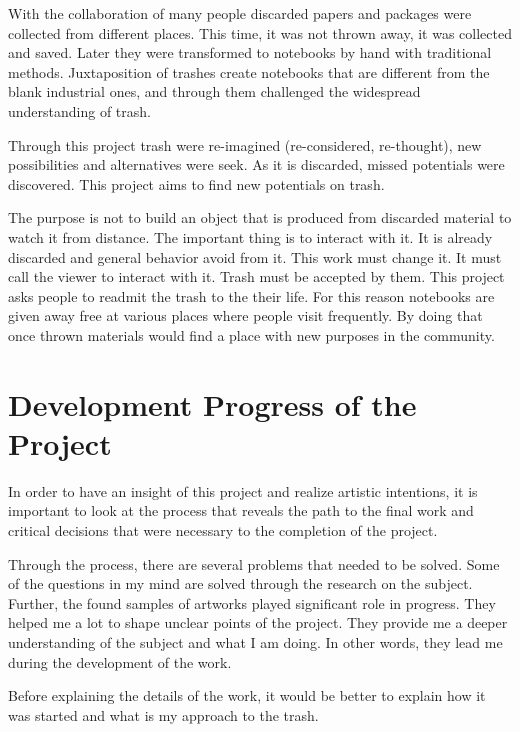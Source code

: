 With the collaboration of many people discarded papers and packages were collected from different places. This time, it was not thrown away, it was collected and saved. Later they were transformed to notebooks by hand with traditional methods. Juxtaposition of trashes create notebooks that are different from the blank industrial ones, and through them challenged the widespread understanding of trash.

Through this project trash were re-imagined (re-considered, re-thought), new possibilities and alternatives were seek. As it is discarded, missed potentials were discovered.  This project aims to find new potentials on trash.

The purpose is not to build an object that is produced from discarded material to watch it from distance. The important thing is to interact with it. It is already discarded and general behavior avoid from it. This work must change it. It must call the viewer to interact with it. Trash must be accepted by them. This project asks people to readmit the trash to the their life. For this reason notebooks are given away free at various places where people visit frequently. By doing that once thrown materials would find a place with new purposes in the community.





%
%
\section{Development Progress of the Project}
In order to have an insight of this project and realize artistic intentions, it is important to look at the process that reveals the path to the final work and critical decisions that were necessary to the completion of the project.

Through the process, there are several problems that needed to be solved. Some of the questions in my mind are solved through the research on the subject. Further, the found samples of artworks played significant role in progress. They helped me a lot to shape unclear points of the project. They provide me a deeper understanding of the subject and what I am doing. In other words, they lead me during the development of the work.






Before explaining the details of the work, it would be better to explain how it was started and what is my approach to the trash.

